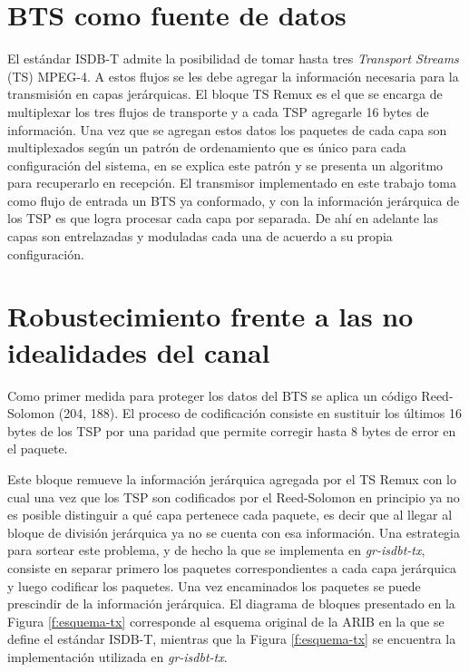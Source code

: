 \section{BTS como fuente de datos}

El est\'andar ISDB-T admite la posibilidad de tomar hasta tres \textit{Transport Streams} (TS) MPEG-4. A estos flujos se les debe agregar la informaci\'on necesaria para la transmisi\'on en capas jer\'arquicas. El bloque TS Remux es el que se encarga de multiplexar los tres flujos de transporte y a cada TSP agregarle 16 bytes de informaci\'on. 
Una vez que se agregan estos datos los paquetes de cada capa son multiplexados seg\'un un patr\'on de ordenamiento que es \'unico para cada configuraci\'on del sistema, en \cite{multiplex-pattern} se explica este patr\'on y se presenta un algoritmo para recuperarlo en recepci\'on. El transmisor implementado en este trabajo toma como flujo de entrada un BTS ya conformado, y con la informaci\'on jer\'arquica de los TSP es que logra procesar cada capa por separada. De ah\'i en adelante las capas son entrelazadas y moduladas cada una de acuerdo a su propia configuraci\'on. 

\section{Robustecimiento frente a las no idealidades del canal}

Como primer medida para proteger los datos del BTS se aplica un c\'odigo Reed-Solomon (204, 188). El proceso de codificaci\'on consiste en sustituir los \'ultimos 16 bytes de los TSP por una paridad que permite corregir hasta 8 bytes de error en el paquete. 

Este bloque remueve la informaci\'on jer\'arquica agregada por el TS Remux con lo cual una vez que los TSP son codificados por el Reed-Solomon en principio ya no es posible distinguir a qu\'e capa pertenece cada paquete, es decir que al llegar al bloque de divisi\'on jer\'arquica ya no se cuenta con esa informaci\'on. Una estrategia para sortear este problema, y de hecho la que se implementa en \textit{gr-isdbt-tx}, consiste en separar primero los paquetes correspondientes a cada capa jer\'arquica y luego codificar los paquetes. Una vez encaminados los paquetes se puede prescindir de la informaci\'on jer\'arquica. El diagrama de bloques presentado en la Figura \ref{f:esquema-tx} corresponde al esquema original de la ARIB en la que se define el est\'andar ISDB-T, mientras que la Figura \ref{f:esquema-tx} se encuentra la implementaci\'on utilizada en \textit{gr-isdbt-tx}. 

